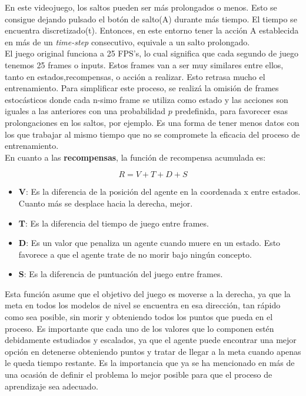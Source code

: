 \documentclass[11pt,fleqn]{book} %
\begin{document}
En este videojuego, los saltos pueden ser más prolongados o menos. Esto se consigue dejando pulsado el botón de salto(A) durante más tiempo. El tiempo se encuentra discretizado(t). Entonces, en este entorno tener la acción A establecida en más de un \textit{time-step} consecutivo, equivale a un salto prolongado. \\

El juego original funciona a 25 FPS's, lo cual significa que cada segundo de juego tenemos 25 frames o inputs. Estos frames van a ser muy similares entre ellos, tanto en estados,recompensas, o acción a realizar. Esto retrasa mucho el entrenamiento. Para simplificar este proceso, se realizá la omisión de frames estocásticos donde cada n-simo frame se utiliza como estado y las acciones son iguales a las anteriores con una probabilidad $p$ predefinida, para favorecer esas prolongaciones en los saltos, por ejemplo. Es una forma de tener menos datos con los que trabajar al mismo tiempo que no se compromete la eficacia del proceso de entrenamiento.\\

En cuanto a las \textbf{recompensas}, la función de recompensa acumulada es: 

\begin{equation*}
R=V+T+D+S
\end{equation*}

\begin{itemize}
	\item \textbf{V}: Es la diferencia de la posición del agente en la coordenada x entre estados. Cuanto más se desplace hacia la derecha, mejor. \\
	
	\item \textbf{T}: Es la diferencia del tiempo de juego entre frames. \\
	
	\item \textbf{D}: Es un valor que penaliza un agente cuando muere en un estado. Esto favorece a que el agente trate de no morir bajo ningún concepto. \\
	
	\item \textbf{S}: Es la diferencia de puntuación del juego entre frames. \\
\end{itemize}

Esta función asume que el objetivo del juego es moverse a la derecha, ya que la meta en todos los modelos de nivel se encuentra en esa dirección, tan rápido como sea posible, sin morir y obteniendo todos los puntos que pueda en el proceso. Es importante que cada uno de los valores que lo componen estén debidamente estudiados y escalados, ya que el agente puede encontrar una mejor opción en detenerse obteniendo puntos y tratar de llegar a la meta cuando apenas le queda tiempo restante. Es la importancia que ya se ha mencionado en más de una ocasión de definir el problema lo mejor posible para que el proceso de aprendizaje sea adecuado. \\
\end{document}
